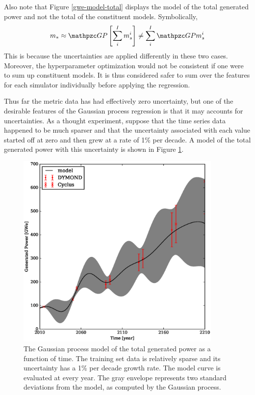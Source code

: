 \clearpage

Also note that Figure \ref{gwe-model-total} displays the model of the total 
generated power and not the total of the constituent models. Symbolically, 
\begin{equation}
\label{total-model}
m_* \approx \GP \left[\sum_i^I m_s^i\right] \ne \sum_i^I \GP m_s^i
\end{equation}
This is because the uncertainties are applied differently in these two cases. 
Moreover, the hyperparameter
optimization would not be consistent if one were to sum up constituent 
models. It is thus considered safer
to sum over the features for each simulator individually before applying the 
regression.

Thus far the metric data has had effectively zero uncertainty, but one of the 
desirable features of the Gaussian process regression is that it may accounts 
for uncertainties. As a thought experiment, suppose that the time 
series data happened to be much sparser and that 
the uncertainty associated with each value started off at zero and then grew at 
a rate of 1\% per decade. A model of the total generated power with this uncertainty 
is shown in Figure \ref{gwe-model-total-with-uncertainty}.

\begin{figure}[htb]
\centering
\includegraphics[width=0.9\textwidth]{gwe-model-total-with-uncertainty.eps}
\caption{The Gaussian process model of the total generated power
as a function of time. The training set data is relatively sparse and its uncertainty
has a 1\% per decade growth rate. The model curve is evaluated at every year. The 
gray envelope represents two standard deviations from the model, as computed by 
the Gaussian process.}
\label{gwe-model-total-with-uncertainty}
\end{figure}

